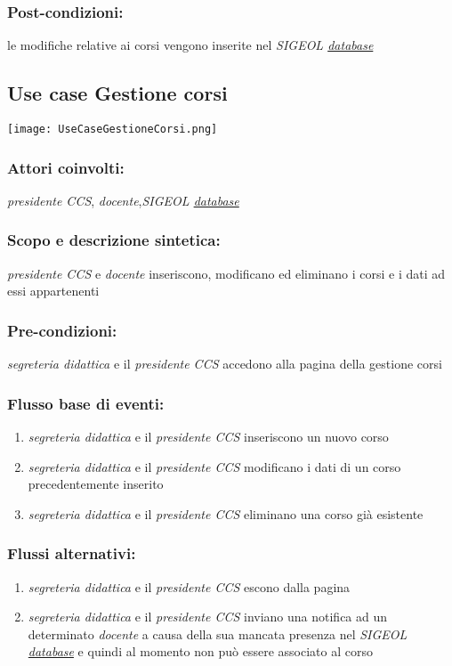 \documentclass[11pt,a4paper]{article}
\begin{document}
\subsubsection*{Post-condizioni:}
le modifiche relative ai corsi vengono inserite nel \textit{SIGEOL \underline{database}}

\subsection{Use case Gestione corsi}
\begin{center} 
 \texttt{[image: UseCaseGestioneCorsi.png]}
\end{center}
\subsubsection*{Attori coinvolti:}
\textit{presidente CCS}, \textit{docente},\textit{SIGEOL \underline{database}}
\subsubsection*{Scopo e descrizione sintetica:}
\textit{presidente CCS} e \textit{docente} inseriscono, modificano ed eliminano i corsi e i dati ad essi appartenenti
\subsubsection*{Pre-condizioni:}
\textit{segreteria didattica} e il \textit{presidente CCS} accedono alla pagina della gestione corsi
\subsubsection*{Flusso base di eventi:}
\begin{enumerate}
 \item \textit{segreteria didattica} e il \textit{presidente CCS} inseriscono un nuovo corso 
 \item \textit{segreteria didattica} e il \textit{presidente CCS} modificano i dati di un corso precedentemente inserito
 \item \textit{segreteria didattica} e il \textit{presidente CCS} eliminano una corso già esistente
\end{enumerate}
\subsubsection*{Flussi alternativi:}
\begin{enumerate} 
\item \textit{segreteria didattica} e il \textit{presidente CCS} escono dalla pagina
\item \textit{segreteria didattica} e il \textit{presidente CCS} inviano una notifica ad un determinato \textit{docente} a causa della sua mancata presenza nel \textit{SIGEOL \underline{database}} e quindi al momento non può essere associato al corso
\end{enumerate}
\end{document}
